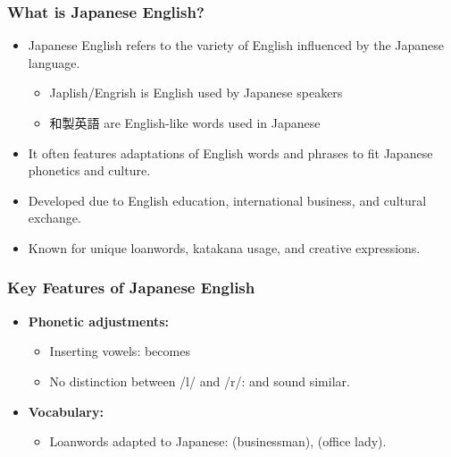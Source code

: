\documentclass{beamer}
\begin{document}
\begin{frame}
\frametitle{What is Japanese English?}
\begin{itemize}
\item Japanese English refers to the variety of English influenced by the Japanese language.
  \begin{itemize}
  \item Japlish/Engrish is English used by Japanese speakers
  \item 和製英語  are English-like words used in Japanese
  \end{itemize}
    \item It often features adaptations of English words and phrases to fit Japanese phonetics and culture.
    \item Developed due to English education, international business, and cultural exchange.
    \item Known for unique loanwords, katakana usage, and creative expressions.
    \end{itemize}

    
\end{frame}

\begin{frame}
\frametitle{Key Features of Japanese English}
\begin{itemize}
    \item \textbf{Phonetic adjustments:}
    \begin{itemize}
        \item Inserting vowels:  becomes 
        \item No distinction between /l/ and /r/:  and  sound similar.
    \end{itemize}
    \item \textbf{Vocabulary:}
    \begin{itemize}
        \item Loanwords adapted to Japanese:  (businessman),  (office lady).
    \end{itemize}
\end{itemize}
\end{frame}
\end{document}
